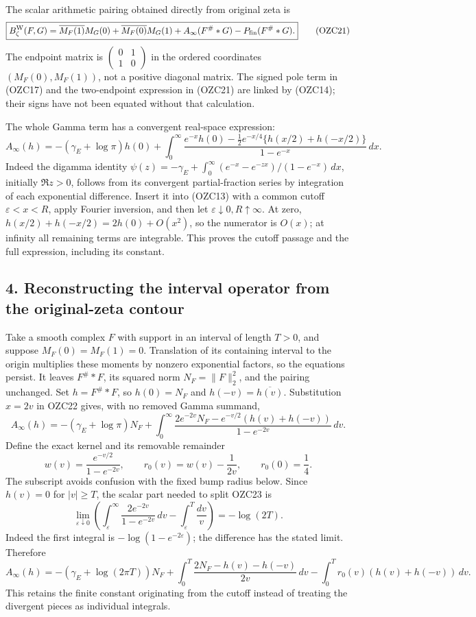 \documentclass[
  10pt,
  a4paper,
]{article}
\begin{document}
The scalar arithmetic pairing obtained directly from original zeta is \[
\boxed{
B_\zeta^{\rm W}(F,G)
=\overline{M_F(1)}M_G(0)+\overline{M_F(0)}M_G(1)
 +A_\infty(F^\#*G)-P_{\rm fin}(F^\#*G).}
\tag{OZC21}
\] The endpoint matrix is
\(\left(\begin{smallmatrix}0&1\\1&0\end{smallmatrix}\right)\) in the
ordered coordinates \((M_F(0),M_F(1))\), not a positive diagonal matrix.
The signed pole term in (OZC17) and the two-endpoint expression in
(OZC21) are linked by (OZC14); their signs have not been equated without
that calculation.

The whole Gamma term has a convergent real-space expression: \[
A_\infty(h)=-(\gamma_E+\log\pi)h(0)
 +\int_0^\infty
 \frac{e^{-x}h(0)-\tfrac12e^{-x/4}\{h(x/2)+h(-x/2)\}}
      {1-e^{-x}}\,dx.
\tag{OZC22}
\] Indeed the digamma identity
\(\psi(z)=-\gamma_E+\int_0^\infty(e^{-x}-e^{-zx})/(1-e^{-x})\,dx\),
initially \(\Re z>0\), follows from its convergent partial-fraction
series by integration of each exponential difference. Insert it into
(OZC13) with a common cutoff \(\varepsilon<x<R\), apply Fourier
inversion, and then let \(\varepsilon\downarrow0,R\uparrow\infty\). At
zero, \(h(x/2)+h(-x/2)=2h(0)+O(x^2)\), so the numerator is \(O(x)\); at
infinity all remaining terms are integrable. This proves the cutoff
passage and the full expression, including its constant.

\subsection{4. Reconstructing the interval operator from the
original-zeta
contour}\label{reconstructing-the-interval-operator-from-the-original-zeta-contour}

Take a smooth complex \(F\) with support in an interval of length
\(T>0\), and suppose \(M_F(0)=M_F(1)=0\). Translation of its containing
interval to the origin multiplies these moments by nonzero exponential
factors, so the equations persist. It leaves \(F^\#*F\), its squared
norm \(N_F=\|F\|_2^2\), and the pairing unchanged. Set \(h=F^\#*F\), so
\(h(0)=N_F\) and \(h(-v)=\overline{h(v)}\). Substitution \(x=2v\) in
OZC22 gives, with no removed Gamma summand, \[
A_\infty(h)=-(\gamma_E+\log\pi)N_F+
\int_0^\infty
\frac{2e^{-2v}N_F-e^{-v/2}(h(v)+h(-v))}{1-e^{-2v}}\,dv.
\tag{OZC23}
\] Define the exact kernel and its removable remainder \[
w(v)=\frac{e^{-v/2}}{1-e^{-2v}},\qquad
r_0(v)=w(v)-\frac1{2v},\qquad r_0(0)=\frac14.
\tag{OZC24}
\] The subscript avoids confusion with the fixed bump radius below.
Since \(h(v)=0\) for \(|v|\ge T\), the scalar part needed to split OZC23
is \[
\lim_{\varepsilon\downarrow0}
\left(\int_\varepsilon^\infty\frac{2e^{-2v}}{1-e^{-2v}}\,dv
-\int_\varepsilon^T\frac{dv}{v}\right)
=-\log(2T).
\tag{OZC25}
\] Indeed the first integral is \(-\log(1-e^{-2\varepsilon})\); the
difference has the stated limit. Therefore \[
A_\infty(h)=-(\gamma_E+\log(2\pi T))N_F
+\int_0^T\frac{2N_F-h(v)-h(-v)}{2v}\,dv
-\int_0^T r_0(v)(h(v)+h(-v))\,dv.
\tag{OZC26}
\] This retains the finite constant originating from the cutoff instead
of treating the divergent pieces as individual integrals.
\end{document}
